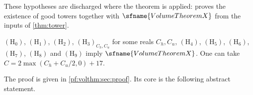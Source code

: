 These hypotheses are discharged where the theorem is applied:
 proves the existence of good towers together
with $\sfname{VolumeTheoremX}$ from the inputs of \cref{thm:tower}.

\begin{theorem}\label{pf:volthm:main}
$(\mathrm{H}_0)$, $(\mathrm{H}_1)$, $(\mathrm{H}_2)$, $(\mathrm{H}_3)_{C_h,C_u}$ for some reals $C_h,C_u$, $(\mathrm{H}_4)$, $(\mathrm{H}_5)$,
$(\mathrm{H}_6)$, $(\mathrm{H}_7)$, $(\mathrm{H}_8)$ and $(\mathrm{H}_9)$ imply
$\sfname{VolumeTheoremX}$. One can take $C=2\max(C_h+C_u/2,0)+17$.
\end{theorem}

The proof is given in \cref{pf:volthm:sec:proof}. Its core is the following abstract statement.

